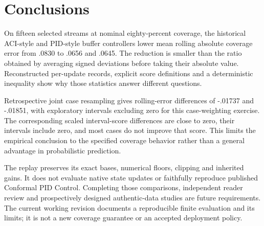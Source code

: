 \section{Conclusions}
On fifteen selected streams at nominal eighty-percent coverage, the historical ACI-style and PID-style buffer controllers lower mean rolling absolute coverage error from .0830 to .0656 and .0645. The reduction is smaller than the ratio obtained by averaging signed deviations before taking their absolute value. Reconstructed per-update records, explicit score definitions and a deterministic inequality show why those statistics answer different questions.

Retrospective joint case resampling gives rolling-error differences of -.01737 and -.01851, with exploratory intervals excluding zero for this case-weighting exercise. The corresponding scaled interval-score differences are close to zero, their intervals include zero, and most cases do not improve that score. This limits the empirical conclusion to the specified coverage behavior rather than a general advantage in probabilistic prediction.

The replay preserves its exact bases, numerical floors, clipping and inherited gains. It does not evaluate native state updates or faithfully reproduce published Conformal PID Control. Completing those comparisons, independent reader review and prospectively designed authentic-data studies are future requirements. The current working revision documents a reproducible finite evaluation and its limits; it is not a new coverage guarantee or an accepted deployment policy.
